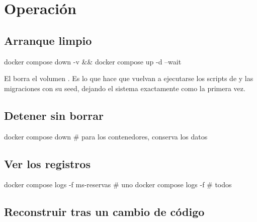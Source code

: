 
\section{Operación}

\subsection{Arranque limpio}

\begin{comando}
docker compose down -v && docker compose up -d --wait
\end{comando}

El  borra el volumen . Es lo que hace que vuelvan a
ejecutarse los scripts de  y las migraciones con su
seed, dejando el sistema exactamente como la primera vez.


\subsection{Detener sin borrar}

\begin{comando}
docker compose down     # para los contenedores, conserva los datos
\end{comando}

\subsection{Ver los registros}

\begin{comando}
docker compose logs -f ms-reservas     # uno
docker compose logs -f                 # todos
\end{comando}

\subsection{Reconstruir tras un cambio de código}

